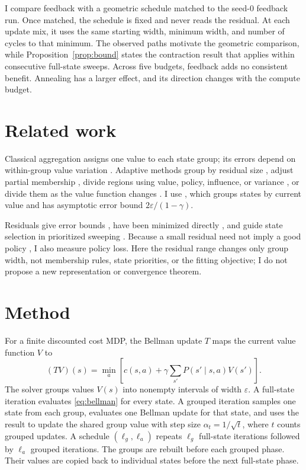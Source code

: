 \documentclass{article}
\begin{document}
I compare feedback with a geometric schedule matched to the seed-0 feedback
run.  Once matched, the schedule is fixed and never reads the residual.  At
each update mix, it uses the same starting width, minimum width, and number of
cycles to that minimum.  The observed paths motivate the geometric comparison,
while
Proposition~\ref{prop:bound} states the contraction result that applies within
consecutive full-state sweeps.  Across five budgets, feedback adds no
consistent benefit.  Annealing has a larger effect, and its direction changes
with the compute budget.

\section{Related work}

Classical aggregation assigns one value to each state group; its errors depend
on within-group value variation \citep{whitt1978,vanroy2006,li2006}.  Adaptive
methods group by residual size \citep{bertsekas1989}, adjust partial membership
\citep{singh1995}, divide regions using value, policy, influence, or variance
\citep{munos2002}, or divide them as the value function changes
\citep{forghieri2024}.  I use \citet{chen2021}, which groups states by current
value and has asymptotic error bound $2\varepsilon/(1-\gamma)$.

Residuals give error bounds \citep{williams1993}, have been minimized directly
\citep{arruda2011}, and guide state selection in prioritized sweeping
\citep{moore1993,wingate2005}.  Because a small residual need not imply a good
policy \citep{geist2017}, I also measure policy loss.  Here the residual range
changes only group width, not membership rules, state priorities, or the
fitting objective; I do not propose a new representation or convergence
theorem.

\section{Method}
\label{sec:method}

For a finite discounted cost MDP, the Bellman update $T$ maps the current value
function $V$ to
\begin{equation}
 (TV)(s)=\min_a\left[c(s,a)+\gamma\sum_{s'}P(s'\mid s,a)V(s')\right].
 \label{eq:bellman}
\end{equation}
The solver groups values $V(s)$ into nonempty intervals of width
$\varepsilon$.  A full-state iteration evaluates \eqref{eq:bellman} for every
state.  A grouped iteration samples one state from each group, evaluates one
Bellman update for that state, and uses the result to update the shared group
value with step size $\alpha_t=1/\sqrt{t}$, where $t$ counts grouped updates.  A schedule
$(\ell_g,\ell_a)$ repeats $\ell_g$ full-state iterations followed by $\ell_a$
grouped iterations.  The groups are rebuilt before each grouped phase.  Their
values are copied back to individual states before the next full-state phase.
\end{document}
